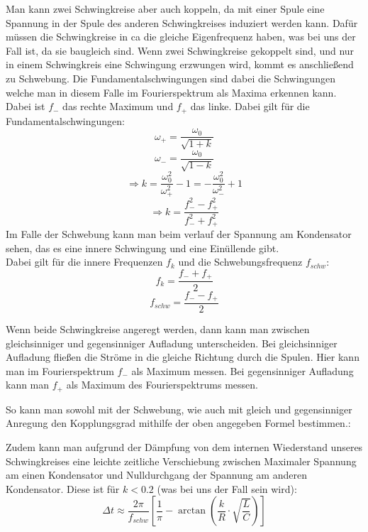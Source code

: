 \documentclass[twoside]{protokoll}
\begin{document}
Man kann zwei Schwingkreise aber auch koppeln, da mit einer Spule eine Spannung in der Spule des anderen Schwingkreises induziert werden kann.
Dafür müssen die Schwingkreise in ca die gleiche Eigenfrequenz haben, was bei uns der Fall ist, da sie baugleich sind.
Wenn zwei Schwingkreise gekoppelt sind, und nur in einem Schwingkreis eine Schwingung erzwungen wird, kommt es anschließend zu Schwebung.
Die Fundamentalschwingungen sind dabei die Schwingungen welche man in diesem Falle im Fourierspektrum als Maxima erkennen kann.
Dabei ist $f_-$ das rechte Maximum und $f_+$ das linke.
Dabei gilt für die Fundamentalschwingungen:
\begin{equation}
    \omega_+ = \frac{\omega_0}{\sqrt{1 + k}}
\end{equation}
\begin{equation}
    \omega_- = \frac{\omega_0}{\sqrt{1 - k}}
\end{equation}
\begin{equation}
    \Rightarrow k = \frac{\omega_0^2}{\omega_+^2} - 1 = - \frac{\omega_0^2}{\omega_-^2} + 1
\end{equation}
\begin{equation}
    \Rightarrow k = \frac{f_-^2 - f_+^2}{f_-^2 + f_+^2}
\end{equation}
Im Falle der Schwebung kann man beim verlauf der Spannung am Kondensator sehen, das es eine innere Schwingung und eine Einüllende gibt. \\
Dabei gilt für die innere Frequenzen $f_k$ und die Schwebungsfrequenz $f_{schw}$:
\begin{equation}
    f_k = \frac{f_- + f_+}{2}
\end{equation}
\begin{equation}
    f_{schw} = \frac{f_- - f_+}{2}
\end{equation}
    

Wenn beide Schwingkreise angeregt werden, dann kann man zwischen gleichsinniger und gegensinniger Aufladung unterscheiden.
Bei gleichsinniger Aufladung fließen die Ströme in die gleiche Richtung durch die Spulen.
Hier kann man im Fourierspektrum $f_-$ als Maximum messen.
Bei gegensinniger Aufladung kann man $f_+$ als Maximum des Fourierspektrums messen.

So kann man sowohl mit der Schwebung, wie auch mit gleich und gegensinniger Anregung den Kopplungsgrad mithilfe der oben angegeben Formel bestimmen.:

Zudem kann man aufgrund der Dämpfung von dem internen Wiederstand unseres Schwingkreises eine leichte zeitliche Verschiebung zwischen Maximaler Spannung am einen Kondensator und Nulldurchgang der Spannung am anderen Kondensator.
Diese ist für $ k < 0.2$ (was bei uns der Fall sein wird):
\begin{equation}
    \Delta t \approx \frac{2 \pi}{f_{schw}} \left[ \frac{1}{\pi} - \arctan{\left( \frac{k}{R} \cdot \sqrt{\frac{L}{C}} \right)} \right]
\end{equation}
\end{document}
